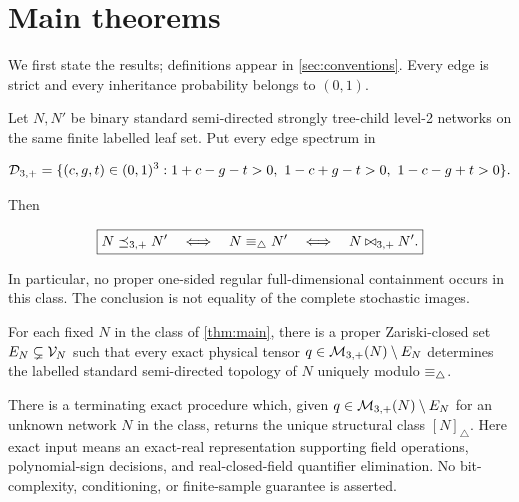 \section{Main theorems}\label{sec:main-theorems}

We first state the results; definitions appear in \cref{sec:conventions}.
Every edge is strict and every inheritance probability belongs to \((0,1)\).

\begin{theorem}\label{thm:main}
Let \(N,N'\) be binary standard semi-directed strongly tree-child level-2
networks on the same finite labelled leaf set.  Put every edge spectrum in

\[
 \mathcal D_{3,+}=\{(c,g,t)\in(0,1)^3:
 1+c-g-t>0,\ 1-c+g-t>0,\ 1-c-g+t>0\}.
\]

Then

\begin{equation}\label{eq:main-classification}
 \boxed{
 N\preceq_{3,+} N'
 \quad\Longleftrightarrow\quad
 N\equiv_\triangle N'
 \quad\Longleftrightarrow\quad
 N\mathbin{\bowtie}_{3,+} N'.}
\end{equation}

In particular, no proper one-sided regular full-dimensional containment
occurs in this class.  The conclusion is not equality of the complete
stochastic images.
\end{theorem}

\begin{theorem}\label{thm:generic}
For each fixed \(N\) in the class of \cref{thm:main}, there is a proper
Zariski-closed set \(E_N\subsetneq\mathcal V_N\) such that every exact physical tensor
\(q\in\mathcal M_{3,+}(N)\setminus E_N\) determines the labelled standard
semi-directed topology of \(N\) uniquely modulo \(\equiv_\triangle\).
\end{theorem}

\begin{theorem}\label{thm:reconstruction}
There is a terminating exact procedure which, given
\(q\in\mathcal M_{3,+}(N)\setminus E_N\) for an unknown network \(N\) in the class,
returns the unique structural class \([N]_\triangle\).  Here exact input means
an exact-real representation supporting field operations, polynomial-sign
decisions, and real-closed-field quantifier elimination.  No bit-complexity,
conditioning, or finite-sample guarantee is asserted.
\end{theorem}

